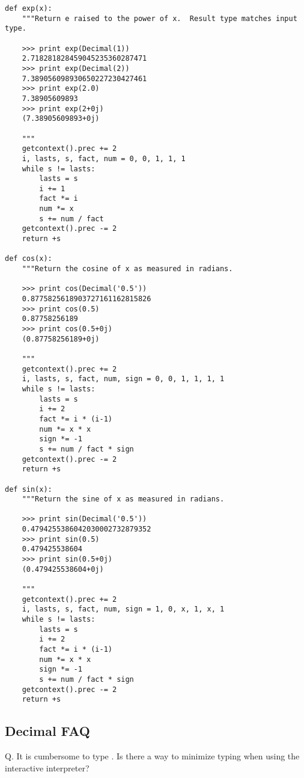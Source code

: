 \begin{verbatim}
def exp(x):
    """Return e raised to the power of x.  Result type matches input type.

    >>> print exp(Decimal(1))
    2.718281828459045235360287471
    >>> print exp(Decimal(2))
    7.389056098930650227230427461
    >>> print exp(2.0)
    7.38905609893
    >>> print exp(2+0j)
    (7.38905609893+0j)
    
    """
    getcontext().prec += 2
    i, lasts, s, fact, num = 0, 0, 1, 1, 1
    while s != lasts:
        lasts = s    
        i += 1
        fact *= i
        num *= x     
        s += num / fact   
    getcontext().prec -= 2        
    return +s

def cos(x):
    """Return the cosine of x as measured in radians.

    >>> print cos(Decimal('0.5'))
    0.8775825618903727161162815826
    >>> print cos(0.5)
    0.87758256189
    >>> print cos(0.5+0j)
    (0.87758256189+0j)
    
    """
    getcontext().prec += 2
    i, lasts, s, fact, num, sign = 0, 0, 1, 1, 1, 1
    while s != lasts:
        lasts = s    
        i += 2
        fact *= i * (i-1)
        num *= x * x
        sign *= -1
        s += num / fact * sign 
    getcontext().prec -= 2        
    return +s

def sin(x):
    """Return the sine of x as measured in radians.

    >>> print sin(Decimal('0.5'))
    0.4794255386042030002732879352
    >>> print sin(0.5)
    0.479425538604
    >>> print sin(0.5+0j)
    (0.479425538604+0j)
    
    """
    getcontext().prec += 2
    i, lasts, s, fact, num, sign = 1, 0, x, 1, x, 1
    while s != lasts:
        lasts = s    
        i += 2
        fact *= i * (i-1)
        num *= x * x
        sign *= -1
        s += num / fact * sign 
    getcontext().prec -= 2        
    return +s

\end{verbatim}                                             



\subsection{Decimal FAQ \label{decimal-faq}}

Q.  It is cumbersome to type .  Is there a way
to minimize typing when using the interactive interpreter?

